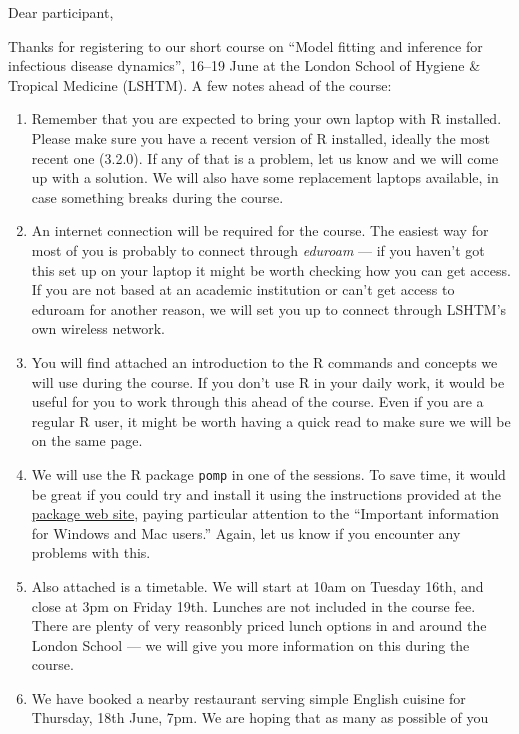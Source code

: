 \documentclass[paper=a4, 11pt]{scrlttr2}
\begin{document}
\begin{letter}{}
\opening{Dear participant,}
Thanks for registering to our short course on ``Model fitting and
inference for infectious disease dynamics'', 16--19 June at the London
School of Hygiene \& Tropical Medicine (LSHTM). A few notes ahead of
the course:

\begin{enumerate}
\item Remember that you are expected to bring your own laptop with R
installed. Please make sure you have a recent version of R installed,
ideally the most recent one (3.2.0). If any of that is a problem, let us know
and we will come up with a solution. We will also have some replacement laptops
available, in case something breaks during the course.
\item An internet connection will be required for the course. The easiest
way for most of you is probably to connect through \emph{eduroam} --- if you
haven't got this set up on your laptop it might be worth checking how you
can get access. If you are not based at an academic institution or can't
get access to eduroam for another reason, we will set you up to connect
through LSHTM's own wireless network.
\item You will find attached an introduction to the R commands and concepts
we will use during the course. If you don't use R in your daily work, it
would be useful for you to work through this ahead of the course. Even
if you are a regular R user, it might be worth having a quick read to
make sure we will be on the same page.
\item We will use the R package \texttt{pomp} in one of the
  sessions. To save time, it would be great if you could try and
  install it using the instructions provided at the 
  \href{http://pomp.r-forge.r-project.org/vignettes/getting_started.html#installing-the-package}{package web site},
  paying particular attention to the ``Important information for
  Windows and Mac users.'' Again, let us know if you encounter any
  problems with this.
\item Also attached is a timetable. We will start at 10am on Tuesday 16th,
and close at 3pm on Friday 19th. Lunches are not included in the
course fee. There are plenty of very reasonbly priced lunch options in
and around the London School --- we will give you more information on
this during the course.
\item We have booked a nearby restaurant serving simple English cuisine for
Thursday, 18th June, 7pm. We are hoping that as many as possible of you

\end{enumerate}
\end{letter}
\end{document}

